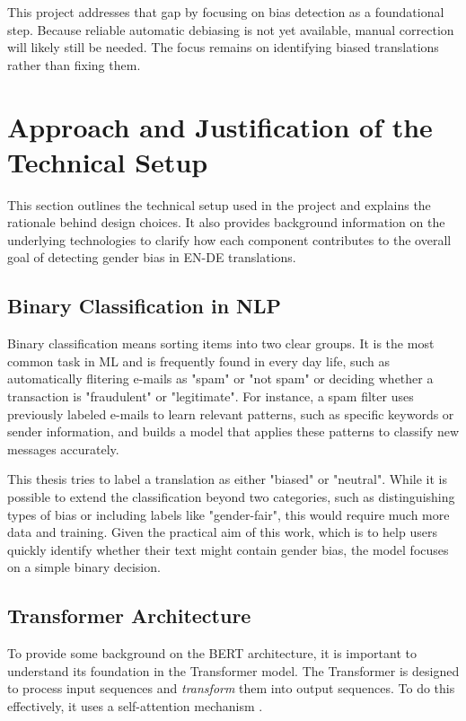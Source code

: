    This project addresses that gap by focusing on bias detection as a foundational step. Because reliable automatic debiasing is not yet available, manual correction will likely still be needed. The focus remains on identifying biased translations rather than fixing them.


\section{Approach and Justification of the Technical Setup}
    This section outlines the technical setup used in the project and explains the rationale behind design choices. It also provides background information on the underlying technologies to clarify how each component contributes to the overall goal of detecting gender bias in EN-DE translations.

\subsection{Binary Classification in NLP}
    Binary classification means sorting items into two clear groups. It is the most common task in ML and is frequently found in every day life, such as automatically flitering e-mails as "spam" or "not spam" \parencite{quemyBinaryClassificationUnstructured2019} or deciding whether a transaction is "fraudulent" or "legitimate". For instance, a spam filter uses previously labeled e-mails to learn relevant patterns, such as specific keywords or sender information, and builds a model that applies these patterns to classify new messages accurately. 
    
    This thesis tries to label a translation as either "biased" or "neutral". While it is possible to extend the classification beyond two categories, such as distinguishing types of bias or including labels like "gender-fair", this would require much more data and training. Given the practical aim of this work, which is to help users quickly identify whether their text might contain gender bias, the model focuses on a simple binary decision.

\subsection{Transformer Architecture} \label{subsection:transformer_arch}
  To provide some background on the BERT architecture, it is important to understand its foundation in the Transformer model. The Transformer is designed to process input sequences and \textit{transform} them into output sequences. To do this effectively, it uses a self-attention mechanism \parencite{phuongFormalAlgorithmsTransformers2022}.

